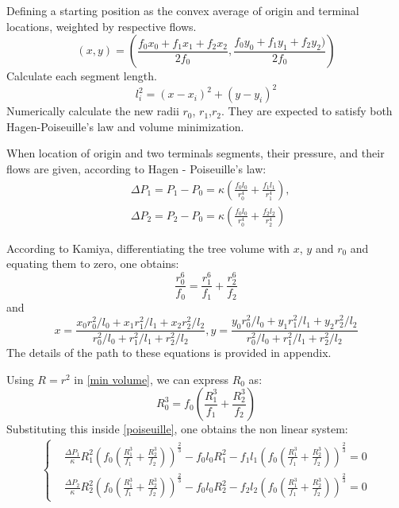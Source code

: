 \documentclass[a4paper, 11pt]{article} %
\begin{document}
Defining a starting position as the convex average of origin and terminal locations, weighted by respective flows.
\begin{equation}
(x,y) = (\frac{f_0x_0 + f_1x_1 + f_2x_2}{2f_0},\frac{f_0y_0 + f_1y_1 + f_2y_2 )}{2f_0})
\end{equation}
Calculate each segment length.
\begin{equation}
l_i^2 = (x - x_i)^2 + (y - y_i)^2
\label{length}
\end{equation}
Numerically calculate the new radii $r_0$, $r_1$,$r_2$. They are expected to satisfy both Hagen-Poiseuille's law and volume minimization.

When location of origin and two terminals segments, their pressure, and their flows are given, according to Hagen - Poiseuille's law:
\begin{align}
&\Delta P_1 = P_1 - P_0 = \kappa(\frac{f_0l_0}{r_0^4} + \frac{f_1l_1}{r_1^4}), \\
&\Delta P_2 = P_2 - P_0 = \kappa(\frac{f_0l_0}{r_0^4} + \frac{f_2l_2}{r_2^4})
\label{poiseuille}
\end{align}
  
According to  Kamiya, differentiating the tree volume with $x$, $y$ and $r_0$ and equating them to zero, one obtains:
\begin{equation}
\frac{r_0^6}{f_0} = \frac{r_1^6}{f_1} + \frac{r_2^6}{f_2}
\label{min volume}
\end{equation}
and 
\begin{equation}
x = \frac{x_0 r_0^2/l_0 + x_1 r_1^2/l_1 + x_2 r_2^2/l_2}{r_0^2/l_0 + r_1^2/l_1 + r_2^2 / l_2},
y = \frac{y_0 r_0^2/l_0 + y_1 r_1^2/l_1 + y_2 r_2^2/l_2}{r_0^2/l_0 + r_1^2/l_1 + r_2^2 / l_2}
\label{position}
\end{equation}
The details of the path to these equations is provided in appendix.

Using $R = r^2$ in \eqref{min volume}, we can express $R_0$ as:
\begin{equation}
R_0^3 = f_0(\frac{R_1^3}{f_1} + \frac{R_2^3}{f_2})
\end{equation} 
Substituting this inside \eqref{poiseuille}, one obtains the non linear system:
\begin{align}
\begin{cases}
&\frac{\Delta P_1}{\kappa}R_1^2 \left(f_0(\frac{R_1^3}{f_1} + \frac{R_2^3}{f_2}) \right)^\frac{2}{3} -f_0l_0R_1^2 - f_1l_1\left(f_0(\frac{R_1^3}{f_1} + \frac{R_2^3}{f_2}) \right)^\frac{2}{3} = 0 \\
&\frac{\Delta P_2}{\kappa}R_2^2 \left(f_0(\frac{R_1^3}{f_1} + \frac{R_2^3}{f_2}) \right)^\frac{2}{3} -f_0l_0R_2^2 - f_2l_2\left(f_0(\frac{R_1^3}{f_1} + \frac{R_2^3}{f_2}) \right)^\frac{2}{3} = 0
\end{cases}
\label{non linear system}
\end{align}
\end{document}
